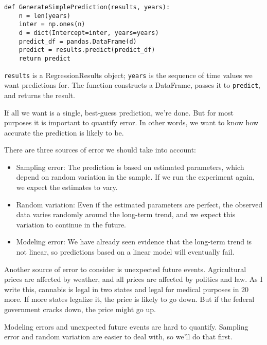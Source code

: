 \begin{verbatim}
def GenerateSimplePrediction(results, years):
    n = len(years)
    inter = np.ones(n)
    d = dict(Intercept=inter, years=years)
    predict_df = pandas.DataFrame(d)
    predict = results.predict(predict_df)
    return predict
\end{verbatim}

{\tt results} is a RegressionResults object; {\tt years} is the
sequence of time values we want predictions for.  The function
constructs a DataFrame, passes it to {\tt predict}, and
returns the result.

If all we want is a single, best-guess prediction, we're done.  But
for most purposes it is important to quantify error.  In other words,
we want to know how accurate the prediction is likely to be.

There are three sources of error we should take into account:

\begin{itemize}

\item Sampling error: The prediction is based on estimated
parameters, which depend on random variation
in the sample.  If we run the experiment again, we expect
the estimates to vary.

\item Random variation:  Even if the estimated parameters are
perfect, the observed data varies randomly around the long-term
trend, and we expect this variation to continue in the future.

\item Modeling error: We have already seen evidence that the long-term
trend is not linear, so predictions based on a linear model will
eventually fail.  

\end{itemize}

Another source of error to consider is unexpected future events.
Agricultural prices are affected by weather, and all prices are
affected by politics and law.  As I write this, cannabis is legal in
two states and legal for medical purposes in 20 more.  If more states
legalize it, the price is likely to go down.  But if
the federal government cracks down, the price might go up.

Modeling errors and unexpected future events are hard to quantify.
Sampling error and random variation are easier to deal with, so we'll
do that first.

